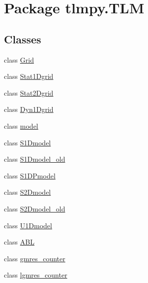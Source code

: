 \hypertarget{namespacetlmpy_1_1TLM}{
\section{Package tlmpy.TLM}
\label{namespacetlmpy_1_1TLM}
}
\subsection*{Classes}
\begin{DoxyCompactItemize}
\item 
class \hyperlink{classtlmpy_1_1TLM_1_1Grid}{Grid}
\item 
class \hyperlink{classtlmpy_1_1TLM_1_1Stat1Dgrid}{Stat1Dgrid}
\item 
class \hyperlink{classtlmpy_1_1TLM_1_1Stat2Dgrid}{Stat2Dgrid}
\item 
class \hyperlink{classtlmpy_1_1TLM_1_1Dyn1Dgrid}{Dyn1Dgrid}
\item 
class \hyperlink{classtlmpy_1_1TLM_1_1model}{model}
\item 
class \hyperlink{classtlmpy_1_1TLM_1_1S1Dmodel}{S1Dmodel}
\item 
class \hyperlink{classtlmpy_1_1TLM_1_1S1Dmodel__old}{S1Dmodel\_\-old}
\item 
class \hyperlink{classtlmpy_1_1TLM_1_1S1DPmodel}{S1DPmodel}
\item 
class \hyperlink{classtlmpy_1_1TLM_1_1S2Dmodel}{S2Dmodel}
\item 
class \hyperlink{classtlmpy_1_1TLM_1_1S2Dmodel__old}{S2Dmodel\_\-old}
\item 
class \hyperlink{classtlmpy_1_1TLM_1_1U1Dmodel}{U1Dmodel}
\item 
class \hyperlink{classtlmpy_1_1TLM_1_1ABL}{ABL}
\item 
class \hyperlink{classtlmpy_1_1TLM_1_1gmres__counter}{gmres\_\-counter}
\item 
class \hyperlink{classtlmpy_1_1TLM_1_1lgmres__counter}{lgmres\_\-counter}
\end{DoxyCompactItemize}
